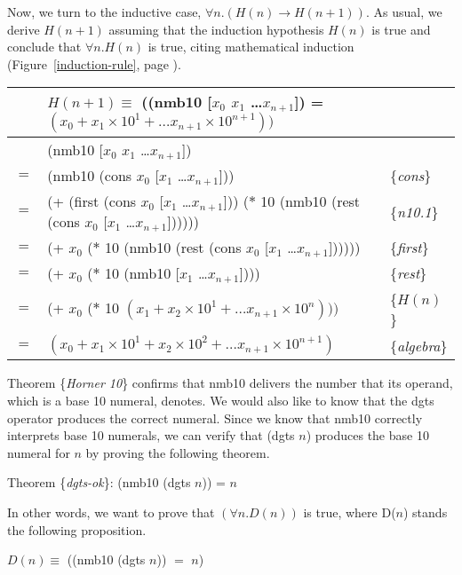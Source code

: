 Now, we turn to the inductive case, $\forall n. (H(n) \rightarrow H(n+1))$.
As usual, we derive $H(n+1)$ assuming that the induction hypothesis $H(n)$ is true
and conclude that $\forall n.H(n)$ is true,
citing mathematical induction
(Figure~\ref{induction-rule}, page \pageref{induction-rule}).

\begin{center}
\begin{tabular}{lll}
 & $H(n+1) \equiv$
((nmb10 [$x_0$ $x_1$ \dots $x_{n+1}$]) =
$(x_0 + x_1 \times 10^1 +  \dots x_{n+1} \times 10^{n+1}))$ & \\
\hline
    & (nmb10 [$x_0$ $x_1$ \dots $x_{n+1}$])           & \\
$=$ & (nmb10 (cons $x_0$ [$x_1$ \dots $x_{n+1}$]))  & \{\emph{cons}\}\\
$=$ & (+ (first (cons $x_0$ [$x_1$ \dots $x_{n+1}$])) ($*$ 10 (nmb10 (rest (cons $x_0$ [$x_1$ \dots $x_{n+1}$])))))  & \{\emph{n10.1}\} \\
$=$ & (+ $x_0$ ($*$ 10 (nmb10 (rest (cons $x_0$ [$x_1$ \dots $x_{n+1}$])))))  & \{\emph{first}\} \\
$=$ & (+ $x_0$ ($*$ 10 (nmb10 [$x_1$ \dots $x_{n+1}$])))  & \{\emph{rest}\}\\
$=$ & (+ $x_0$ ($*$ 10 $(x_1 + x_2 \times 10^1 + \dots x_{n+1} \times 10^{n})))$  & \{$H(n)$\}\\
$=$ & $(x_0 + x_1 \times 10^1 + x_2 \times 10^2 + \dots x_{n+1} \times 10^{n+1})$  & \{\emph{algebra}\} \\
\end{tabular}
\end{center}

Theorem \{\emph{Horner 10}\} confirms that nmb10 delivers the
number that its operand, which is a base 10 numeral, denotes.
We would also like to know that the dgts operator
produces the correct numeral.
Since we know that nmb10 correctly interprets base 10 numerals,
we can verify that (dgts $n$) produces the base 10 numeral for $n$
by proving the following theorem.
\begin{center}
\label{dgts-ok}
Theorem \{\emph{dgts-ok}\}:
(nmb10 (dgts $n$)) = $n$
\end{center}

In other words, we want to prove that
$(\forall n.D(n))$ is true, where D($n$) stands the following proposition.
\begin{center}
$D(n) \equiv$ ((nmb10 (dgts $n$)) $=$ $n$)
\end{center}

